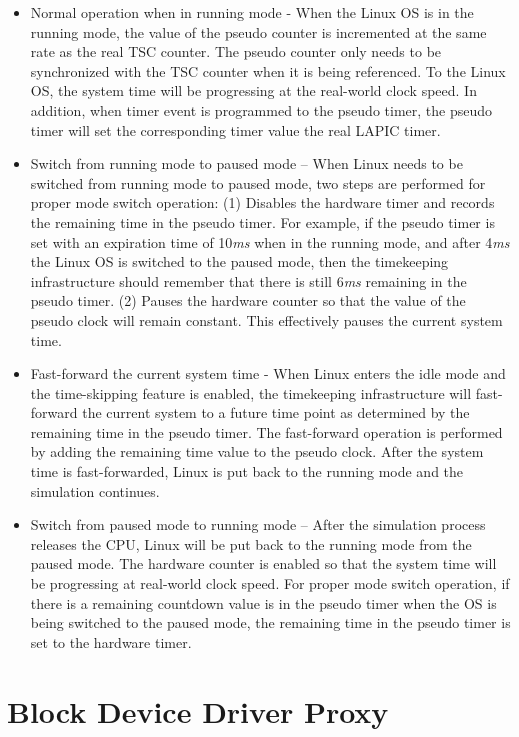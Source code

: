 \begin{itemize}
	\item Normal operation when in running mode - When the Linux OS is in the running mode, the value of the pseudo counter is incremented at the same rate as the real TSC counter. The pseudo counter only needs to be synchronized with the TSC counter when it is being referenced. To the Linux OS, the system time will be progressing at the real-world clock speed. In addition, when timer event is programmed to the pseudo timer, the pseudo timer will set the corresponding timer value the real LAPIC timer.
	
	\item Switch from running mode to paused mode – When Linux needs to be switched from running mode to paused mode, two steps are performed for proper mode switch operation: (1) Disables the hardware timer and records the remaining time in the pseudo timer. For example, if the pseudo timer is set with an expiration time of 10\textit{ms} when in the running mode, and after 4\textit{ms} the Linux OS is switched to the paused mode, then the timekeeping infrastructure should remember that there is still 6\textit{ms} remaining in the pseudo timer. (2) Pauses the hardware counter so that the value of the pseudo clock will remain constant. This effectively pauses the current system time.
	
	\item Fast-forward the current system time - When Linux enters the idle mode and the time-skipping feature is enabled, the timekeeping infrastructure will fast-forward the current system to a future time point as determined by the remaining time in the pseudo timer. The fast-forward operation is performed by adding the remaining time value to the pseudo clock. After the system time is fast-forwarded, Linux is put back to the running mode and the simulation continues.
	
	\item Switch from paused mode to running mode – After the simulation process releases the CPU, Linux will be put back to the running mode from the paused mode. The hardware counter is enabled so that the system time will be progressing at real-world clock speed. For proper mode switch operation, if there is a remaining countdown value is in the pseudo timer when the OS is being switched to the paused mode, the remaining time in the pseudo timer is set to the hardware timer.
\end{itemize}

\section{Block Device Driver Proxy}
\label{sec:storage-device-simulation-module}

